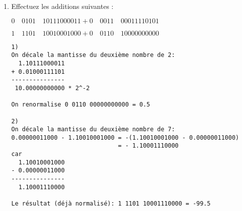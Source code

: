 \documentclass[a4paper,10pt]{exam}
\begin{document}
\begin{enumerate}

\item Effectuez les additions suivantes :

$0\quad  0101\quad  10111000011 + 0\quad  0011\quad  00011110101$

$1\quad  1101\quad  10010001000 + 0\quad  0110\quad  10000000000$

\begin{solution}
\begin{verbatim}
1)
On décale la mantisse du deuxième nombre de 2:
  1.10111000011
+ 0.01000111101
---------------
 10.00000000000 * 2^-2

On renormalise 0 0110 00000000000 = 0.5

2)
On décale la mantisse du deuxième nombre de 7:
0.00000011000 - 1.10010001000 = -(1.10010001000 - 0.00000011000)
                              = - 1.10001110000
car
  1.10010001000
- 0.00000011000
---------------
  1.10001110000

Le résultat (déjà normalisé): 1 1101 10001110000 = -99.5
\end{verbatim}
\end{solution}
\end{enumerate}
\end{document}
